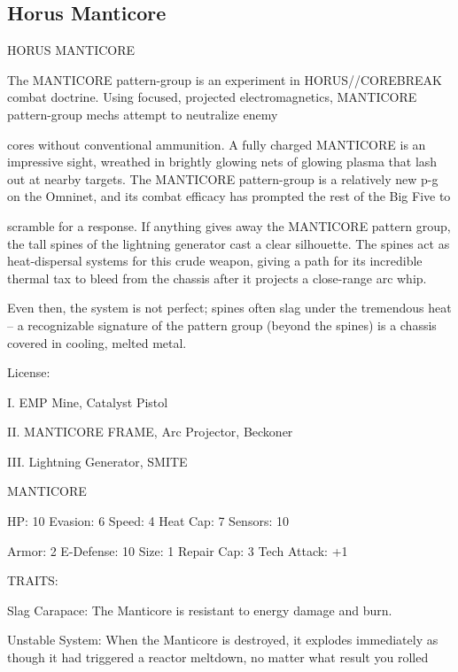 \subsection{Horus Manticore}

                                        HORUS MANTICORE  

The MANTICORE pattern-group is an experiment in HORUS//COREBREAK combat doctrine. Using  
focused, projected electromagnetics, MANTICORE pattern-group mechs attempt to neutralize enemy  

cores without conventional ammunition. A fully charged MANTICORE is an impressive sight, wreathed in  
brightly glowing nets of glowing plasma that lash out at nearby targets. The MANTICORE pattern-group is  
a relatively new p-g on the Omninet, and its combat efficacy has prompted the rest of the Big Five to  

scramble for a response. If anything gives away the MANTICORE pattern group, the tall spines of the  
lightning generator cast a clear silhouette. The spines act as heat-dispersal systems for this crude weapon,  
giving a path for its incredible thermal tax to bleed from the chassis after it projects a close-range arc whip.  

Even then, the system is not perfect; spines often slag under the tremendous heat -- a recognizable  
signature of the pattern group (beyond the spines) is a chassis covered in cooling, melted metal.    

                                                    License:
 
I. EMP Mine, Catalyst Pistol
 
II. MANTICORE FRAME, Arc Projector, Beckoner
 
III. Lightning Generator, SMITE
 

                                                MANTICORE 

 HP: 10          Evasion: 6                            Speed: 4            Heat Cap: 7        Sensors: 10 

 Armor: 2        E-Defense: 10                         Size: 1             Repair Cap: 3      Tech Attack:   
                                                                                              +1 

                                                    TRAITS: 

 Slag Carapace: The Manticore is resistant to energy damage and burn.
 
 Unstable System: When the Manticore is destroyed, it explodes immediately as though it had triggered  
 a reactor meltdown, no matter what result you rolled 

